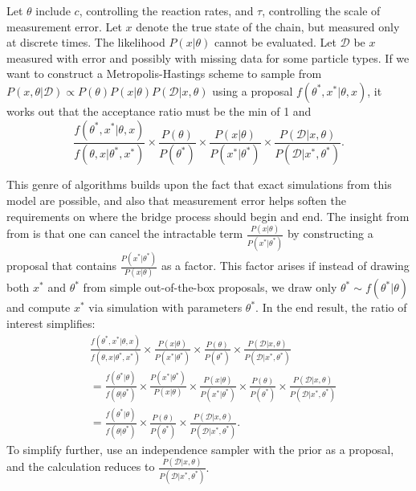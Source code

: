 \documentclass{article}
\begin{document}
Let $\theta$ include $c$, controlling the reaction rates, and $\tau$, controlling the scale of measurement error. Let $x$ denote the true state of the chain, but measured only at discrete times. The likelihood $P(x|\theta)$ cannot be evaluated. Let $\mathcal{D}$ be $x$ measured with error and possibly with missing data for some particle types. If we want to construct a Metropolis-Hastings scheme to sample from $P(x, \theta|\mathcal{D})\propto P( \theta)P(x| \theta)P(\mathcal{D}|x, \theta)$ using a proposal $f(\theta^*, x^*|\theta, x)$, it works out that the acceptance ratio must be the min of 1 and $$\frac{f(\theta^*, x^*|\theta, x)}{f(\theta, x|\theta^*, x^*)}\times 
\frac{ P( \theta)}{ P( \theta^*)} \times 
\frac{P(x| \theta)}{P(x^*| \theta^*)} \times
 \frac{P(\mathcal{D}|x, \theta)}{P(\mathcal{D}|x^*, \theta^*)}.$$ 

This genre of algorithms builds upon the fact that exact simulations from this model are possible, and also that measurement error helps soften the requirements on where the bridge process should begin and end. %
The insight from from \cite{Marjoram23122003} is that one can cancel the intractable term $ \frac{P(x| \theta)}{P(x^*| \theta^*)}$ by constructing a proposal that contains  $\frac{P(x^*| \theta^*)}{P(x| \theta)}$ as a factor. This factor arises if instead of drawing both $x^*$ and $\theta^*$ from simple out-of-the-box proposals, we draw only $\theta^*\sim f(\theta^*|\theta)$ and compute $x^*$ via simulation with parameters $\theta^*$. In the end result, the ratio of interest simplifies:
\begin{align*}
&\frac{f(\theta^*, x^*|\theta, x)}{f(\theta, x|\theta^*, x^*)}\times \frac{P(x| \theta)}{P(x^*| \theta^*)}\times \frac{ P( \theta)}{ P( \theta^*)}  \times \frac{P(\mathcal{D}|x, \theta)}{P(\mathcal{D}|x^*, \theta^*)}\\
&=\frac{f(\theta^*|\theta)}{f(\theta|\theta^*)}\times \frac{P(x^*| \theta^*)}{P(x| \theta)} \times \frac{P(x| \theta)}{P(x^*| \theta^*)} \times \frac{ P( \theta)}{ P( \theta^*)}\times \frac{P(\mathcal{D}|x, \theta)}{P(\mathcal{D}|x^*, \theta^*)}\\
&=\frac{f(\theta^*|\theta)}{f(\theta|\theta^*)}\times \frac{ P( \theta)}{ P( \theta^*)}\times \frac{P(\mathcal{D}|x, \theta)}{P(\mathcal{D}|x^*, \theta^*)}.
\end{align*}
To simplify further, use an independence sampler with the prior as a proposal, and the calculation reduces to $ \frac{P(\mathcal{D}|x, \theta)}{P(\mathcal{D}|x^*, \theta^*)}.$
\end{document}
